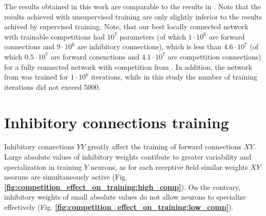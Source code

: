 \documentclass[a4paper,10pt]{article}
\newcommand{\refbf}[1]{\textbf{\ref{#1}}}
\begin{document}
The results obtained in this work are comparable to the results in \parencite{saunders2019locally}. Note that the results achieved with unsupervised training are only slightly inferior to the results achived by supervised training. Note, that our best locally connected network with trainable competitions had $ 10^7 $ parameters (of which $ 1 \cdot 10^6 $ are forward connections and $ 9 \cdot 10^6 $ are inhibitory connections), which is less than $ 4.6 \cdot 10^7 $ (of which $ 0.5 \cdot 10^7 $ are forward conenctions and $ 4.1 \cdot 10^7 $ are compettition connections) for a fully connected network with competition from \parencite{mnist2}. In addition, the network from \parencite{mnist2} was trained for $ 1 \cdot 10^6 $ iterations, while in this study the number of training iterations did not exceed 5000. 

\section{Inhibitory connections training}
\label{section:competition-training}
Inhibitory connections $YY$ greatly affect the training of forward connections $XY$. Large absolute values of inhibitory weights contibute to greater variability and specialization in training $Y$ neurons, as for each receptive field similar weights $XY$ neoruns are simultaneously active (Fig. \refbf{fig:competition_effect_on_training:high_comp}). On the contrary, inhibitory weights of small absolute values do not allow neurons to specialize effectively (Fig. \refbf{fig:competition_effect_on_training:low_comp}). 
\end{document}
